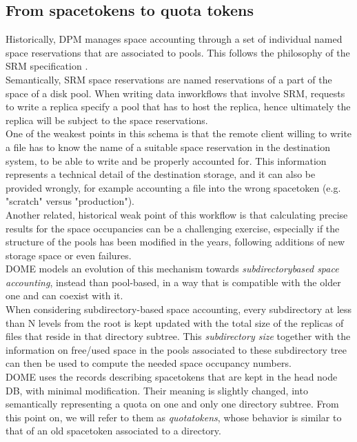 \documentclass[a4paper]{jpconf}
\begin{document}
\subsection{From spacetokens to quota tokens}
Historically, DPM manages space accounting through a set of individual named space reservations that are associated to pools. This follows the
philosophy of the SRM specification \cite{srm}.\\
Semantically, SRM space reservations are named reservations of a part of the space of a disk pool. When  writing data
inworkflows that involve SRM, requests to write a replica specify a pool
that has to host the replica, hence ultimately the replica will be subject to the space reservations.\\

One of the weakest points in this schema is that the remote client willing to write a file
has to know the name of a suitable space reservation in the destination system, to be able to write
and be properly accounted for. This information represents a technical detail
of the destination storage, and it can also  be provided wrongly, for example accounting
a file into the wrong spacetoken (e.g. "scratch" versus "production").\\

Another related, historical weak point of this workflow is that calculating precise results for the space occupancies can be a challenging exercise,
especially if the structure of the pools has been modified in the years, following additions of new storage space or
even failures.\\
DOME models an evolution of this mechanism towards \textit{subdirectory\-based space accounting}, instead than pool-based, in a way
that is compatible with the older one and can coexist with it.\\

When considering subdirectory-based space accounting, every subdirectory at less than N levels from the root is kept
updated with the total size of the replicas of files that reside in that directory subtree.
This \textit{subdirectory size} together with the information on free/used space in the pools associated to these subdirectory tree
can then be used to compute the needed space occupancy numbers.\\

DOME uses the records describing spacetokens that are kept in the head node DB, with minimal modification. Their meaning is slightly changed,
into semantically representing a quota on one and only one directory subtree. From this point on, we will refer to them as \textit{quotatokens},
whose behavior is similar to that of an old spacetoken associated to a directory.\\
\end{document}
